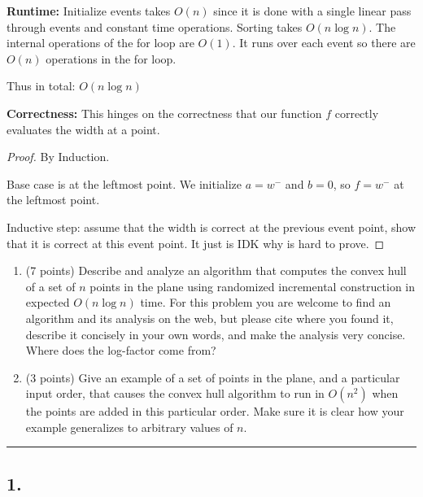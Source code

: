 \documentclass[11pt]{article}
\begin{document}
\textbf{Runtime:} Initialize events takes $O(n)$ since it is done with a single linear pass through events and constant time operations.
Sorting takes $O(n \log n)$. The internal operations of the for loop are $O(1)$. 
It runs over each event so there are $O(n)$ operations in the for loop.

Thus in total: $O(n \log n)$


\textbf{Correctness:} 
This hinges on the correctness that our function $f$ correctly evaluates the width at a point.
\newpage
\begin{proof}
    By Induction.

    Base case is at the leftmost point. We initialize $a = w^-$ and $b = 0$, so $f = w^-$
    at the leftmost point.

    Inductive step: assume that the width is correct at the previous event point, show that it is correct at this event point.
    It just is IDK why is hard to prove.
\end{proof}




\begin{enumerate}

    \item (7 points) Describe and analyze an algorithm that computes the
        convex hull of a set of $n$ points in the plane using randomized
        incremental construction in expected $O(n \log n)$ time. For this
        problem you are welcome to find an algorithm and its analysis on the
        web, but please cite where you found it, describe it concisely in
        your own words, and make the analysis very concise. Where does the
        log-factor come from?

    \item (3 points) Give an example of a set of points in the plane, and a
        particular input order, that causes the convex hull algorithm to run in
        $O(n^2)$ when the points are added in this particular order. Make sure it
        is clear how your example generalizes to arbitrary values of $n$.

\end{enumerate}
\hrule

\subsection*{1. }
\end{document}
